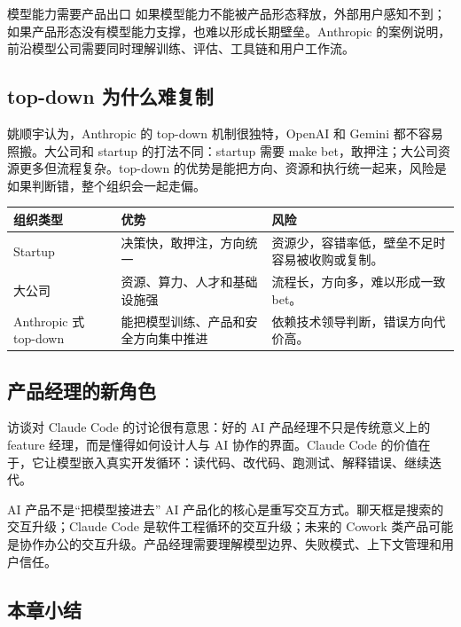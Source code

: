 \documentclass[a4paper]{article}
\begin{document}
\begin{importantbox}{模型能力需要产品出口}
如果模型能力不能被产品形态释放，外部用户感知不到；如果产品形态没有模型能力支撑，也难以形成长期壁垒。Anthropic 的案例说明，前沿模型公司需要同时理解训练、评估、工具链和用户工作流。
\end{importantbox}

\subsection{top-down 为什么难复制}

姚顺宇认为，Anthropic 的 top-down 机制很独特，OpenAI 和 Gemini 都不容易照搬。大公司和 startup 的打法不同：startup 需要 make bet，敢押注；大公司资源更多但流程复杂。top-down 的优势是能把方向、资源和执行统一起来，风险是如果判断错，整个组织会一起走偏。

\noindent\begin{tabularx}{\textwidth}{p{}p{}X}
\toprule
组织类型 & 优势 & 风险 \\
\midrule
Startup & 决策快，敢押注，方向统一 & 资源少，容错率低，壁垒不足时容易被收购或复制。 \\
大公司 & 资源、算力、人才和基础设施强 & 流程长，方向多，难以形成一致 bet。 \\
Anthropic 式 top-down & 能把模型训练、产品和安全方向集中推进 & 依赖技术领导判断，错误方向代价高。 \\
\bottomrule
\end{tabularx}

\subsection{产品经理的新角色}

访谈对 Claude Code 的讨论很有意思：好的 AI 产品经理不只是传统意义上的 feature 经理，而是懂得如何设计人与 AI 协作的界面。Claude Code 的价值在于，它让模型嵌入真实开发循环：读代码、改代码、跑测试、解释错误、继续迭代。

\begin{knowledgebox}{AI 产品不是“把模型接进去”}
AI 产品化的核心是重写交互方式。聊天框是搜索的交互升级；Claude Code 是软件工程循环的交互升级；未来的 Cowork 类产品可能是协作办公的交互升级。产品经理需要理解模型边界、失败模式、上下文管理和用户信任。
\end{knowledgebox}

\subsection{本章小结}
\end{document}
